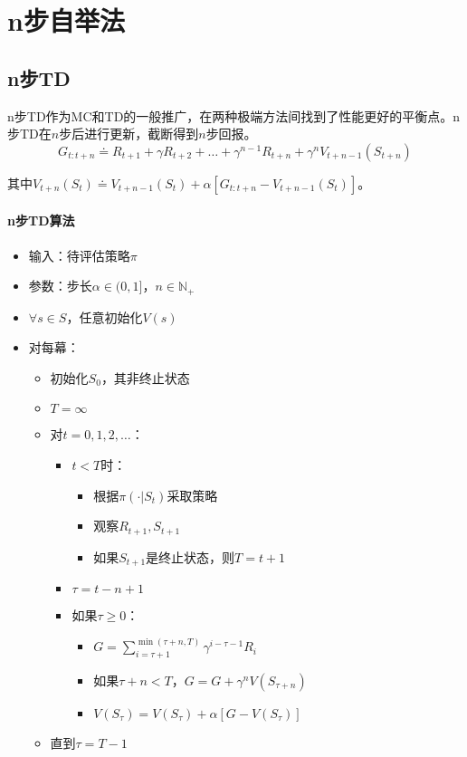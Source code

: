 \documentclass[
12pt, %
a4paper, 
oneside, %
headinclude,footinclude, %
]{scrartcl}
\begin{document}
\section{n步自举法}
\subsection{n步TD}
n步TD作为MC和TD的一般推广，在两种极端方法间找到了性能更好的平衡点。n步TD在$ n $步后进行更新，截断得到$ n $步回报。
$$ G_{t:t + n} \doteq R_{t + 1} + \gamma R_{t + 2} + \dots + \gamma^{n - 1} R_{t + n} + \gamma^n V_{t + n - 1}(S_{t + n}) $$

其中$ V_{t + n}(S_t) \doteq V_{t + n - 1}(S_t) + \alpha[G_{t:t + n} - V_{t + n - 1}(S_t)] $。
\paragraph{n步TD算法}
\begin{itemize}
\item 输入：待评估策略$ \pi $
\item 参数：步长$ \alpha \in (0,1] $，$ n \in \mathbb{N}_+ $
\item $ \forall s \in S $，任意初始化$ V(s) $
\item 对每幕：
\begin{itemize}
\item 初始化$ S_0 $，其非终止状态
\item $ T = \infty $
\item 对$ t = 0, 1, 2, \dots $：
\begin{itemize}
\item $ t < T $时：
\begin{itemize}
\item 根据$ \pi(\cdot|S_t) $采取策略
\item 观察$ R_{t + 1}, S_{t + 1} $
\item 如果$ S_{t + 1} $是终止状态，则$ T = t + 1 $
\end{itemize}
\item $ \tau = t - n + 1 $
\item 如果$ \tau \geq 0 $：
\begin{itemize}
\item $ G = \sum_{i = \tau + 1}^{\min(\tau + n, T)} \gamma^{i - \tau - 1}R_i $
\item 如果$ \tau + n < T $，$ G = G + \gamma^n V(S_{\tau + n}) $
\item $ V(S_{\tau}) = V(S_{\tau}) + \alpha[G - V(S_{\tau})] $
\end{itemize}
\end{itemize}
\item 直到$ \tau = T - 1 $
\end{itemize}
\end{itemize}
\end{document}
